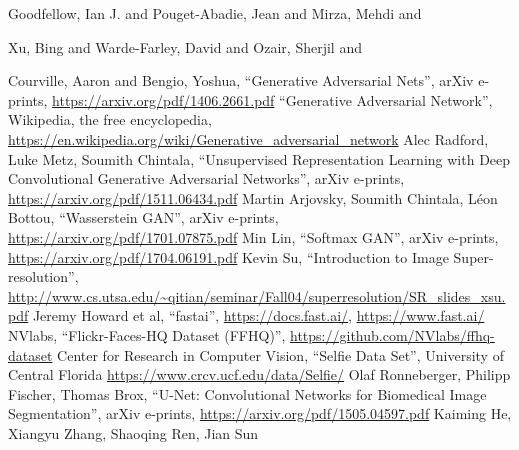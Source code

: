 \documentclass[conference]{IEEEtran}
\begin{document}
	
	
	\begin{thebibliography}{30}
		 {Goodfellow}, Ian J. and {Pouget-Abadie}, Jean and {Mirza}, Mehdi and

	{Xu}, Bing and {Warde-Farley}, David and {Ozair}, Sherjil and

{Courville}, Aaron and {Bengio}, Yoshua, ``Generative Adversarial Nets'', arXiv e-prints, \url{https://arxiv.org/pdf/1406.2661.pdf}
		 ``Generative Adversarial Network'', Wikipedia, the free encyclopedia, \url{https://en.wikipedia.org/wiki/Generative\_adversarial\_network}
		 Alec Radford, Luke Metz, Soumith Chintala, ``Unsupervised Representation Learning with Deep Convolutional Generative Adversarial Networks'', arXiv e-prints, \url{https://arxiv.org/pdf/1511.06434.pdf}
		 Martin Arjovsky, Soumith Chintala, Léon Bottou, ``Wasserstein GAN'', arXiv e-prints, \url{https://arxiv.org/pdf/1701.07875.pdf}
		 Min Lin, ``Softmax GAN'', arXiv e-prints, \url{https://arxiv.org/pdf/1704.06191.pdf}
		  Kevin Su, ``Introduction to Image Super-resolution'', \url{http://www.cs.utsa.edu/~qitian/seminar/Fall04/superresolution/SR_slides_xsu.pdf} 
		 Jeremy Howard et al, ``fastai'', \url{https://docs.fast.ai/}, \url{https://www.fast.ai/}
		 NVlabs, ``Flickr-Faces-HQ Dataset (FFHQ)'', \url{https://github.com/NVlabs/ffhq-dataset}
		 Center for Research in Computer Vision, ``Selfie Data Set'', University of Central Florida \url{https://www.crcv.ucf.edu/data/Selfie/}
		 Olaf Ronneberger, Philipp Fischer, Thomas Brox, ``U-Net: Convolutional Networks for Biomedical Image Segmentation'', arXiv e-prints, \url{https://arxiv.org/pdf/1505.04597.pdf}
		 Kaiming He, Xiangyu Zhang, Shaoqing Ren, Jian Sun


\end{thebibliography}
\end{document}
